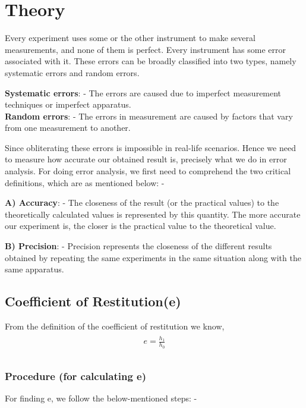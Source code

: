 \documentclass[11pt]{scrartcl} %
\begin{document}
\section{Theory}
Every experiment uses some or the other instrument to make several measurements, and none of them is perfect. Every instrument has some error associated with it. These errors can be broadly classified into two types, namely systematic errors and random errors.\par 
\textbf{Systematic errors}: - The errors are caused due to imperfect measurement techniques or imperfect apparatus. \\
\textbf{Random errors}: - The errors in measurement are caused by factors that vary from one measurement to another. \par 

Since obliterating these errors is impossible in real-life scenarios. Hence we need to measure how accurate our obtained result is, precisely what we do in error analysis. For doing error analysis, we first need to comprehend the two critical definitions, which are as mentioned below: - \par 

\textbf{A) Accuracy}: - The closeness of the result (or the practical values) to the theoretically calculated values is represented by this quantity. The more accurate our experiment is, the closer is the practical value to the theoretical value.\par

\textbf{B) Precision}: - Precision represents the closeness of the different results obtained by repeating the same experiments in the same situation along with the same apparatus. \par

\subsection{Coefficient of Restitution(e)}
From the definition of the coefficient of restitution we know, 
\begin{align} 
	\begin{split}
		e = \frac{h_1}{h_0}\\
	\end{split}					
\end{align}

\subsubsection{Procedure (for calculating e)}
For finding e, we follow the below-mentioned steps: - \par
\end{document}

